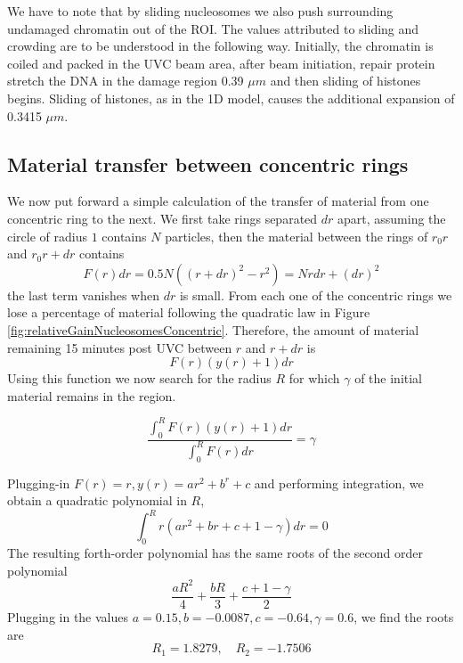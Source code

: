 \documentclass[12pt]{report}
\begin{document}
We have to note that by sliding nucleosomes we also push surrounding undamaged chromatin out of the ROI. The values attributed to sliding and crowding are to be understood in the following way. Initially, the chromatin is coiled and packed in the UVC beam area, after beam initiation, repair protein stretch the DNA in the damage region 0.39 $\mu m$ and then sliding of histones begins. Sliding of histones, as in the 1D model, causes the additional expansion of 0.3415 $\mu m$. 

\subsection{Material transfer between concentric rings}\label{subsection:materialTransferBetweenConcentricRings}
We now put forward a simple calculation of the transfer of material from one concentric ring to the next. We first take rings separated  $dr$ apart, assuming the circle of radius  $1$ contains $N$ particles, then the material between the rings of $r_0 r$ and $r_0 r+dr$ contains  
\begin{equation*}
F(r)dr = 0.5N\left((r+dr)^2- r^2\right)=Nrdr+(dr)^2
\end{equation*}
the last term vanishes when $dr$ is small.
From each one of the concentric rings we lose a percentage of material following the 
quadratic law in Figure \ref{fig:relativeGainNucleosomesConcentric}. Therefore, the amount of material remaining 15 minutes post UVC between $r$ and $r+dr$ is
\begin{equation*}
F(r)(y(r)+1)dr
\end{equation*}
Using this function we now search for the radius $R$ for which $\gamma$ of the initial material remains in the region. 

\begin{equation*}
\frac{\int_0^RF(r)(y(r)+1)dr}{\int_0^RF(r)dr} =\gamma
\end{equation*} 

Plugging-in  $F(r)=r,y(r)=ar^2 +b^r +c$ and performing integration, we obtain a quadratic polynomial in $R$,
\begin{equation*}
\int_0^R r(ar^2 +br+c +1-\gamma)dr =0
\end{equation*}
The resulting forth-order polynomial has the same roots of the second order polynomial 
\begin{equation*}
\frac{aR^2}{4} +\frac{bR}{3} +\frac{c+1-\gamma}{2}
\end{equation*}
Plugging in the values $a=0.15, b=-0.0087,c=-0.64, \gamma=0.6$, we find the roots are \begin{equation*}
R_1=1.8279, \quad R_2= -1.7506
\end{equation*}
\end{document}
